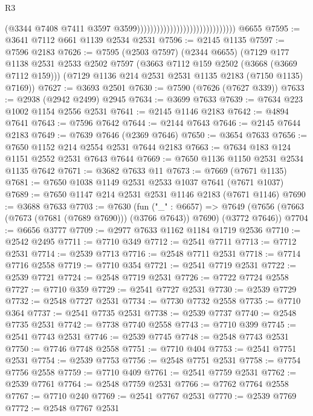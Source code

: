 \begin{lexlean}{R3}
\begin{coremodule}
                                                              (@3344
                                                                @7408
                                                                @7411
                                                                @3597
                                                                @3599))))))))))))))))))))))))))))))
    @6655
@7595 := @3641 @7112 @661 @1139 @2534 @2531
@7596 := @2145 @1135
@7597 := @7596 @2183
@7626 := @7595
    (@2503 @7597)
    (@2344 @6655)
    (@7129
      @177
      @1138
      @2531
      @2533
      @2502
      @7597
      (@3663 @7112 @159 @2502 (@3668 (@3669 @7112 @159)))
      (@7129 @1136 @214 @2531 @2531 @1135 @2183 (@7150 @1135) @7169))
@7627 := @3693 @2501
@7630 := @7590 (@7626 (@7627 @339))
@7633 := @2938 (@2942 @2499) @2945
@7634 := @3699 @7633
@7639 := @7634 @223 @1002 @1154 @2556 @2531
@7641 := @2145 @1146 @2183
@7642 := @4894 @7641
@7643 := @7596 @7642
@7644 := @2144 @7643
@7646 := @2145 @7644 @2183
@7649 := @7639 @7646 (@2369 @7646)
@7650 := @3654 @7633
@7656 := @7650 @1152 @214 @2554 @2531 @7644 @2183
@7663 := @7634 @183 @124 @1151 @2552 @2531 @7643 @7644
@7669 := @7650 @1136 @1150 @2531 @2534 @1135 @7642
@7671 := @3682 @7633 @11
@7673 := @7669 (@7671 @1135)
@7681 := @7650 @1038 @1149 @2531 @2533 @1037 @7641 (@7671 @1037)
@7689 := @7650 @1147 @214 @2531 @2531 @1146 @2183 (@7671 @1146)
@7690 := @3688 @7633
@7703 := @7630
    (fun ("_" : @6657) =>
    @7649 (@7656 (@7663 (@7673 (@7681 (@7689 @7690))) (@3766 @7643)) @7690) (@3772 @7646))
@7704 := @6656 @3777
@7709 := @2977 @7633 @1162 @1184 @1719 @2536
@7710 := @2542 @2495
@7711 := @7710 @349
@7712 := @2541 @7711
@7713 := @7712 @2531
@7714 := @2539 @7713
@7716 := @2548 @7711 @2531
@7718 := @7714 @7716 @2558
@7719 := @7710 @354
@7721 := @2541 @7719 @2531
@7722 := @2539 @7721
@7724 := @2548 @7719 @2531
@7726 := @7722 @7724 @2558
@7727 := @7710 @359
@7729 := @2541 @7727 @2531
@7730 := @2539 @7729
@7732 := @2548 @7727 @2531
@7734 := @7730 @7732 @2558
@7735 := @7710 @364
@7737 := @2541 @7735 @2531
@7738 := @2539 @7737
@7740 := @2548 @7735 @2531
@7742 := @7738 @7740 @2558
@7743 := @7710 @399
@7745 := @2541 @7743 @2531
@7746 := @2539 @7745
@7748 := @2548 @7743 @2531
@7750 := @7746 @7748 @2558
@7751 := @7710 @404
@7753 := @2541 @7751 @2531
@7754 := @2539 @7753
@7756 := @2548 @7751 @2531
@7758 := @7754 @7756 @2558
@7759 := @7710 @409
@7761 := @2541 @7759 @2531
@7762 := @2539 @7761
@7764 := @2548 @7759 @2531
@7766 := @7762 @7764 @2558
@7767 := @7710 @240
@7769 := @2541 @7767 @2531
@7770 := @2539 @7769
@7772 := @2548 @7767 @2531

\end{coremodule}
\end{lexlean}
